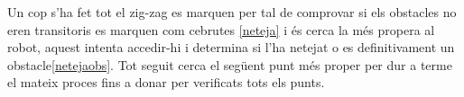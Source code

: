 Un cop s'ha fet tot el zig-zag es marquen per tal de comprovar si els obstacles no eren transitoris es marquen
com ce\lgem brutes \ref{neteja} i és cerca la més propera al robot, aquest intenta accedir-hi i determina si l'ha netejat o es definitivament un
obstacle\ref{netejaobs}. Tot seguit cerca el següent punt més proper per dur a terme el mateix proces fins a donar per verificats tots els punts.

 